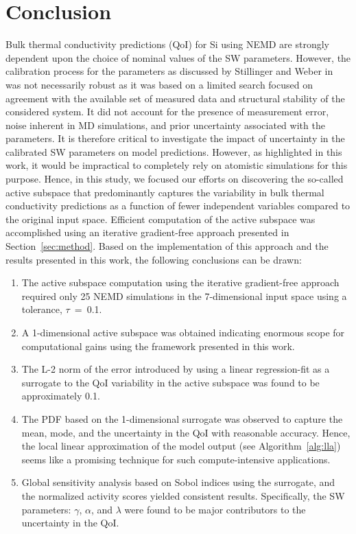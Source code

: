 \section{Conclusion}
\label{sec:conc}

Bulk thermal conductivity predictions (QoI) for Si using NEMD are strongly dependent upon the
choice of nominal values of the SW parameters. However, the calibration process for the
parameters as discussed by Stillinger and Weber in~\cite{Stillinger:1985} was not
necessarily robust as it was based on a limited search focused on agreement with the 
available set of measured data and structural stability of the considered system. 
It did not account for the presence of measurement error, noise inherent in MD simulations,
and prior uncertainty associated with the parameters. It is therefore critical to
investigate the impact of uncertainty in the calibrated SW parameters on model predictions.
However, as highlighted in this work, it would be impractical to completely rely on
atomistic simulations for this purpose. Hence, in this study, we focused our efforts on
discovering the so-called active subspace that predominantly captures the variability
in bulk thermal conductivity predictions as a function of fewer independent variables
compared to the original input space. Efficient computation of the active subspace
was accomplished using an iterative gradient-free approach presented in 
Section~\ref{sec:method}. Based on the implementation of this approach and the results
presented in this work, the following conclusions can be drawn:
%
\begin{enumerate}
\item The active subspace computation using the iterative gradient-free approach
required only 25 NEMD simulations in the 7-dimensional input space using a tolerance, 
$\tau$~=~0.1.

\item A 1-dimensional active subspace was obtained indicating enormous scope for
computational gains using the framework presented in this work.

\item The L-2 norm of the error introduced by using a linear regression-fit as a surrogate to the
QoI variability in the active subspace was found to be approximately 0.1.

\item The PDF based on the 1-dimensional surrogate was observed to capture the mean, mode, and
the uncertainty in the QoI with reasonable accuracy. Hence, the local linear approximation
of the model output (see Algorithm~\ref{alg:lla}) seems like a promising technique for
such compute-intensive applications.

\item Global sensitivity analysis based on Sobol indices using the surrogate, and the
normalized activity scores yielded consistent results. Specifically, the SW parameters:
$\gamma$, $\alpha$, and $\lambda$ were found to be major contributors to the
uncertainty in the QoI.   

\end{enumerate}
